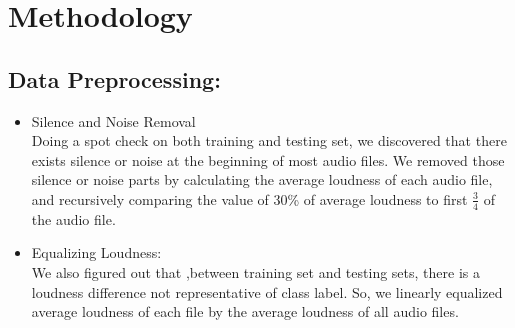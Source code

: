 \section{Methodology}
\subsection{Data Preprocessing:}
\begin{itemize}
	\item Silence and Noise Removal\\
	Doing a spot check on both training and testing set, we discovered that there exists silence or noise at the beginning of most audio files. We removed those silence or noise parts by calculating the average loudness of each audio file, and recursively comparing the value of 30\% of average loudness to first $\frac{3}{4}$ of the audio file.\\
	\item Equalizing Loudness:\\
	We also figured out that ,between training set and testing sets, there is a loudness difference not representative of class label. So, we linearly equalized average loudness of each file by the average loudness of all audio files. \\
\end{itemize}
